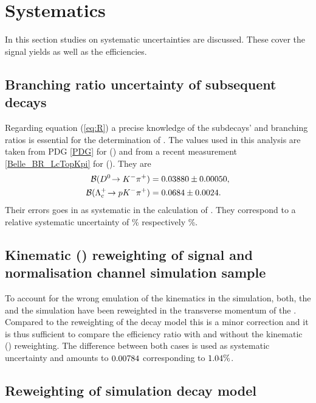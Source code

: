 \chapter{Systematics}
\label{sec:Systematics}

In this section studies on systematic uncertainties are discussed.
These cover the signal yields as well as the efficiencies.

\section{Branching ratio uncertainty of subsequent decays}
Regarding equation (\ref{eq:R}) a precise knowledge of the subdecays' \DToKpi and \LcTopKpi branching ratios is essential for the determination of \R.
The values used in this analysis are taken from PDG \ref{PDG} for \BR(\DToKpi) and from a recent \belle measurement \ref{Belle_BR_LcTopKpi} for \BR(\LcTopKpi).
They are
\begin{align*}
    {\ensuremath{\cal B}}({{D}^0}\!\rightarrow {\ensuremath{{K}^-}}{\ensuremath{{\pi}^+}}) &= 0.03880 \pm 0.00050, \\ 
    {\cal B}({{\Lambda}^+_{c}}\!\rightarrow {\ensuremath{p}}{\ensuremath{{K}^-}}{\ensuremath{{\pi}^+}}) &= 0.0684 \pm 0.0024.
\end{align*}
Their errors goes in as systematic in the calculation of \R.
They correspond to a relative systematic uncertainty of \SystBRDToKpipercent\% respectively \SystBRLcTopKpipercent\%.

\section{Kinematic \pt(\Lb) reweighting of signal and normalisation channel simulation sample}
To account for the wrong emulation of the \Lb kinematics in the simulation, both, the \LbToDpmunuX and the \LbToLcmunu simulation have been reweighted in the transverse momentum of the \Lb.
Compared to the reweighting of the \LbToDpmunuX decay model this is a minor correction and it is thus sufficient to compare the efficiency ratio \effRatio with and without the kinematic \pt(\Lb) reweighting.
The difference between both cases is used as systematic uncertainty and amounts to $0.00784$ corresponding to $1.04\%$.


\section{Reweighting of \LbToDpmunuX simulation decay model}
